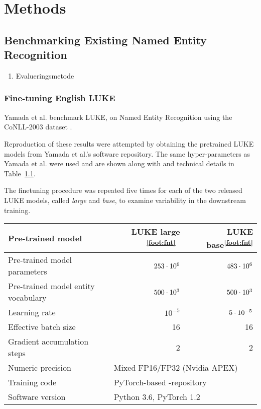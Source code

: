 \documentclass[main.tex]{subfiles}
\begin{document}
\chapter{Methods}

\section{Benchmarking Existing Named Entity Recognition}
\begin{enumerate}
    \item Evalueringsmetode
\end{enumerate}
\subsection{Fine-tuning English LUKE}
Yamada et al. benchmark LUKE, on Named Entity Recognition using the CoNLL-2003 dataset \cite{yamada2020luke}.

Reproduction of these results were attempted by obtaining the pretrained LUKE models from Yamada et al.'s software repository.
The same hyper-parameters as Yamada et al. were used and are shown along with and technical details in Table~\ref{tab:params}.

The finetuning procedure was repeated five times for each of the two released LUKE models, called \emph{large} and \emph{base}, to examine variability in the downstream training.
\addtocounter{footnote}{1}
\begin{table}[H]
    \centering
    \begin{tabular}{l|rr}
        Pre-trained model
                                    & LUKE large \textsuperscript{\ref{foot:fnt}}\
                                                & LUKE base\textsuperscript{\ref{foot:fnt}}\\\hline
        Pre-trained model parameters & $253\cdot10^{6}$ & $483\cdot10^{6}$\\
        Pre-trained model entity vocabulary & $500\cdot10^{3}$ & $500\cdot10^{3}$\\
        Learning rate               & $10^{-5}$ & $5\cdot10^{-5}$\\
        Effective batch size        & 16 & 16\\
        Gradient accumulation steps & 2 & 2\\
        Numeric precision           & \multicolumn{2}{l}{Mixed FP16/FP32 (Nvidia APEX)}\\
        Training code               & \multicolumn{2}{l}{PyTorch-based \code{luke}-repository \protect\footnotemark}\\
        Software version            & \multicolumn{2}{l}{Python 3.6, PyTorch 1.2}
    \end{tabular}
    \label{tab:params}
\end{table}
\end{document}
